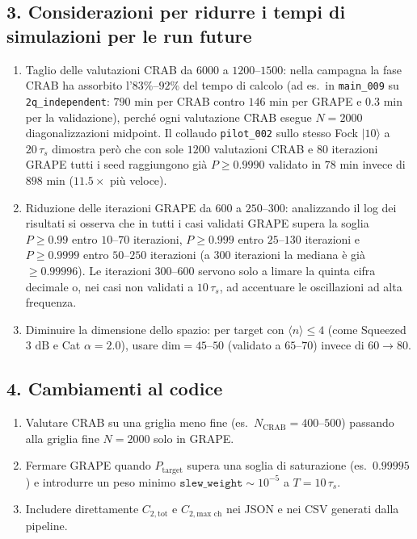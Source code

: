 \documentclass[11pt,a4paper]{article}
\begin{document}
\subsection*{3. Considerazioni per ridurre i tempi di simulazioni per le run future}
\begin{enumerate}
    \item Taglio delle valutazioni CRAB da $6000$ a $1200\text{--}1500$: nella campagna la fase CRAB ha assorbito l'$83\%\text{--}92\%$ del tempo di calcolo (ad es.\ in \texttt{main\_009} su \texttt{2q\_independent}: $790\text{ min}$ per CRAB contro $146\text{ min}$ per GRAPE e $0.3\text{ min}$ per la validazione), perché ogni valutazione CRAB esegue $N=2000$ diagonalizzazioni midpoint. Il collaudo \texttt{pilot\_002} sullo stesso Fock $|10\rangle$ a $20\,\tau_s$ dimostra però che con sole $1200$ valutazioni CRAB e $80$ iterazioni GRAPE tutti i seed raggiungono già $P \ge 0.9990$ validato in $78\text{ min}$ invece di $898\text{ min}$ ($11.5\times$ più veloce).
    \item Riduzione delle iterazioni GRAPE da $600$ a $250\text{--}300$: analizzando il log dei risultati si osserva che in tutti i casi validati GRAPE supera la soglia $P \ge 0.99$ entro $10\text{--}70$ iterazioni, $P \ge 0.999$ entro $25\text{--}130$ iterazioni e $P \ge 0.9999$ entro $50\text{--}250$ iterazioni (a $300$ iterazioni la mediana è già $\ge 0.99996$). Le iterazioni $300\text{--}600$ servono solo a limare la quinta cifra decimale o, nei casi non validati a $10\,\tau_s$, ad accentuare le oscillazioni ad alta frequenza.
    \item Diminuire la dimensione dello spazio: per target con $\langle n\rangle \le 4$ (come Squeezed $3\text{ dB}$ e Cat $\alpha=2.0$), usare $\text{dim}=45\text{--}50$ (validato a $65\text{--}70$) invece di $60\to 80$.
\end{enumerate}

\subsection*{4. Cambiamenti al codice}
\begin{enumerate}
    \item Valutare CRAB su una griglia meno fine (es.\ $N_{\text{CRAB}} = 400\text{--}500$) passando alla griglia fine $N=2000$ solo in GRAPE.
    \item Fermare GRAPE quando $P_{\text{target}}$ supera una soglia di saturazione (es.\ $0.99995$) e introdurre un peso minimo $\texttt{slew\_weight} \sim 10^{-5}$ a $T=10\,\tau_s$.
    \item Includere direttamente $C_{2,\text{tot}}$ e $C_{2,\text{max ch}}$ nei JSON e nei CSV generati dalla pipeline.
\end{enumerate}
\end{document}
